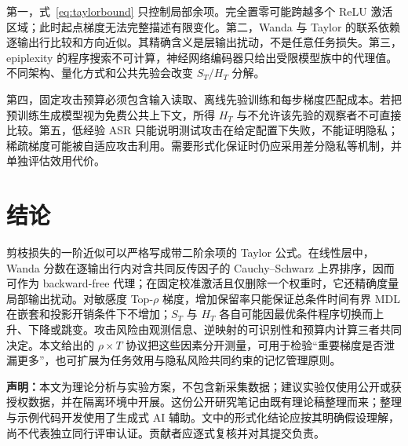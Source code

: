 \documentclass[conference,a4paper]{IEEEtran}
\begin{document}
第一，式~\eqref{eq:taylorbound} 只控制局部余项。完全置零可能跨越多个 ReLU 激活区域；此时起点梯度无法完整描述有限变化。第二，Wanda 与 Taylor 的联系依赖逐输出行比较和方向近似。其精确含义是层输出扰动，不是任意任务损失。第三，epiplexity 的程序搜索不可计算，神经网络编码器只给出受限模型族中的代理值。不同架构、量化方式和公共先验会改变 $S_T/H_T$ 分解。

第四，固定攻击预算必须包含输入读取、离线先验训练和每步梯度匹配成本。若把预训练生成模型视为免费公共上下文，所得 $H_T$ 与不允许该先验的观察者不可直接比较。第五，低经验 ASR 只能说明测试攻击在给定配置下失败，不能证明隐私；稀疏梯度可能被自适应攻击利用\cite{dimitrov2024spear}。需要形式化保证时仍应采用差分隐私等机制，并单独评估效用代价。

\section{结论}

剪枝损失的一阶近似可以严格写成带二阶余项的 Taylor 公式。在线性层中，Wanda 分数在逐输出行内对含共同反传因子的 Cauchy--Schwarz 上界排序，因而可作为 backward-free 代理；在固定校准激活且仅删除一个权重时，它还精确度量局部输出扰动。对敏感度 Top-$\rho$ 梯度，增加保留率只能保证总条件时间有界 MDL 在嵌套和投影开销条件下不增加；$S_T$ 与 $H_T$ 各自可能因最优条件程序切换而上升、下降或跳变。攻击风险由观测信息、逆映射的可识别性和预算内计算三者共同决定。本文给出的 $\rho\times T$ 协议把这些因素分开测量，可用于检验“重要梯度是否泄漏更多”，也可扩展为任务效用与隐私风险共同约束的记忆管理原则。

\noindent\textbf{声明：}本文为理论分析与实验方案，不包含新采集数据；建议实验仅使用公开或获授权数据，并在隔离环境中开展。这份公开研究笔记由既有理论稿整理而来；整理与示例代码开发使用了生成式 AI 辅助。文中的形式化结论应按其明确假设理解，尚不代表独立同行评审认证。贡献者应逐式复核并对其提交负责。



\end{document}
